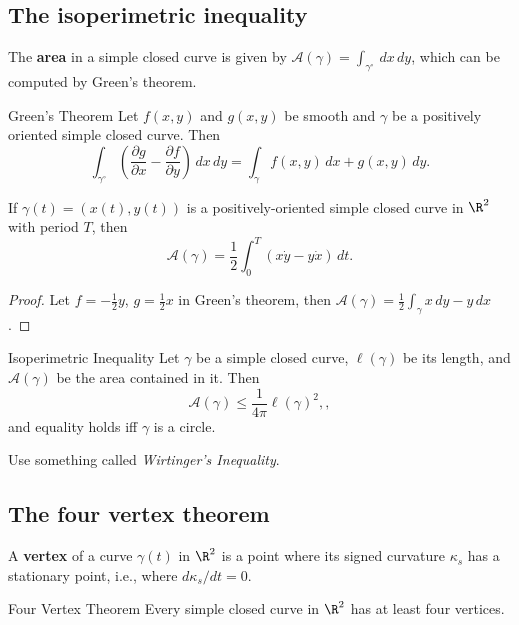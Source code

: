 \subsection{The isoperimetric inequality}
The \textbf{area} in a simple closed curve is given by $\mathcal A(\gamma )=\int_{\gamma ^{\circ}}^{}    \, dx\, dy$, which can be computed by Green's theorem.
\begin{namedthm}{Green's Theorem} 
    Let $f(x,y)$ and $g(x,y)$ be smooth and $\gamma $ be a positively oriented simple closed curve. Then \[
        \int_{\gamma ^{\circ} }^{} \left( \frac{\partial g}{\partial x}-\frac{\partial f}{\partial y} \right)   \, dx\, dy= \int_{\gamma } f(x,y) \, dx + g(x,y)\,dy.
    \] 
\end{namedthm}
\begin{prop}
    If $\gamma (t)=(x(t),y(t))$ is a positively-oriented simple closed curve in $\R^2$ with period $T$, then \[
        \mathcal{A} (\gamma )=\frac{1}{2}\int_{0}^{T} (x\dot y-y\dot x) \, dt.
    \] 
\end{prop}
\begin{proof}
    Let $f=-\frac{1}{2}y$, $g=\frac{1}{2}x$ in Green's theorem, then $\mathcal{A} (\gamma )=\frac{1}{2}\int_{\gamma }^{} x  \, dy-y \,dx$.
\end{proof}
\begin{namedthm}{Isoperimetric Inequality} 
    Let $\gamma $ be a simple closed curve, $\ell(\gamma )$ be its length, and $\mathcal{A} (\gamma )$ be the area contained in it. Then \[
        \mathcal{A} (\gamma )\leq \frac{1}{4\pi}\ell(\gamma )^2,
 ,   \]  and equality holds iff $\gamma $ is a circle.
\end{namedthm}
Use something called \emph{Wirtinger's Inequality}.

\subsection{The four vertex theorem}
\begin{definition}[]
    A \textbf{vertex} of a curve $\gamma(t) $ in $\R^2$ is a point where its signed curvature $\kappa_s$ has a stationary point, i.e., where $d\kappa_s /dt=0$.
\end{definition}
\begin{namedthm}{Four Vertex Theorem} 
   Every simple closed curve in $\R^2$ has at least four vertices. 
\end{namedthm}
